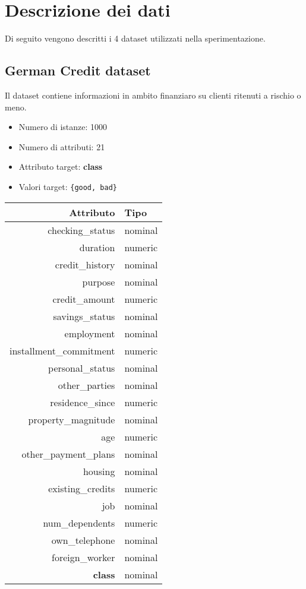 \chapter{Descrizione dei dati}
\label{ch:data}

Di seguito vengono descritti i 4 dataset utilizzati nella sperimentazione.

\section{German Credit dataset}
Il dataset contiene informazioni in ambito finanziaro su clienti ritenuti a rischio o meno.

\begin{itemize}
	\item Numero di istanze: 1000
	\item Numero di attributi: 21
	\item Attributo target: \textbf{class}
	\item Valori target: \texttt{\{good, bad\}}
\end{itemize}

\begin{table}[!htb]
	\centering
	\begin{tabular}{|r|l|}
		\hline
		Attributo               & Tipo    \\
		\hline
		checking\_status        & nominal \\
		duration                & numeric \\
		credit\_history         & nominal \\
		purpose                 & nominal \\
		credit\_amount          & numeric \\
		savings\_status         & nominal \\
		employment              & nominal \\
		installment\_commitment & numeric \\
		personal\_status        & nominal \\
		other\_parties          & nominal \\
		residence\_since        & numeric \\
		property\_magnitude     & nominal \\
		age                     & numeric \\
		other\_payment\_plans   & nominal \\
		housing                 & nominal \\
		existing\_credits       & numeric \\
		job                     & nominal \\
		num\_dependents         & numeric \\
		own\_telephone          & nominal \\
		foreign\_worker         & nominal \\
		\textbf{class}          & nominal \\
		\hline
	\end{tabular}
\end{table}


